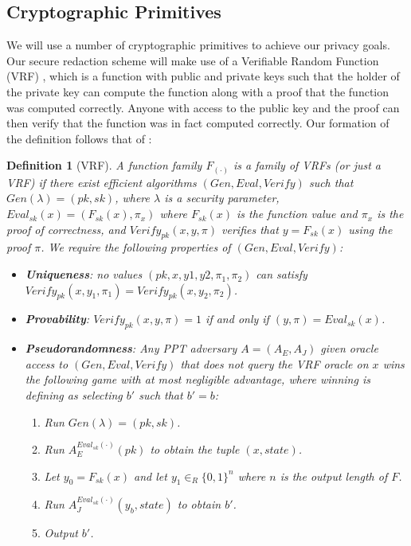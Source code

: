 \documentclass[letterpaper,twocolumn,10pt]{article}
\newtheorem{definition}[theorem]{Definition}
\begin{document}
\subsection{Cryptographic Primitives}
We will use a number of cryptographic primitives to achieve our privacy goals. Our secure redaction scheme will make use of a Verifiable Random Function (VRF) \cite{MRV99}, which is a function with public and private keys such that the holder of the private key can compute the function along with a proof that the function was computed correctly. Anyone with access to the public key and the proof can then verify that the function was in fact computed correctly. Our formation of the definition follows that of \cite{DY05}:
\begin{definition}[VRF]
A function family $F_{(\cdot)}$ is a family of VRFs (or just a VRF) if there exist efficient algorithms $(Gen, Eval, Verify)$ such that $Gen(\lambda)=(pk, sk)$, where $\lambda$ is a security parameter, $Eval_{sk}(x)=(F_{sk}(x), \pi_x)$ where $F_{sk}(x)$ is the function value and $\pi_x$ is the proof of correctness, and $Verify_{pk}(x,y,\pi)$ verifies that $y=F_{sk}(x)$ using the proof $\pi$. We require the following properties of $(Gen, Eval, Verify)$:
\begin{itemize}
\item \textbf{Uniqueness}: no values $(pk, x, y1, y2, \pi_1, \pi_2)$ can satisfy $Verify_{pk}(x, y_1, \pi_1) = Verify_{pk}(x, y_2, \pi_2)$.
\item \textbf{Provability}:  $Verify_{pk}(x,y,\pi)=1$ if and only if $(y,\pi)=Eval_{sk}(x)$.
\item \textbf{Pseudorandomness}: Any PPT adversary $A=(A_E,A_J)$ given oracle access to $(Gen, Eval, Verify)$ that does not query the VRF oracle on $x$ wins the following game with at most negligible advantage, where winning is defining as selecting $b'$ such that $b'=b$:
\begin{enumerate}
\item Run $Gen(\lambda)=(pk,sk)$.
\item Run $A_E^{Eval_{sk}(\cdot)}(pk)$ to obtain the tuple $(x, state)$.
\item Let $y_0=F_{sk}(x)$ and let $y_1\in_R\{0,1\}^n$ where $n$ is the output length of $F$.
\item Run $A_J^{Eval_{sk}(\cdot)}(y_b, state)$ to obtain $b'$.
\item Output $b'$.
\end{enumerate}
\end{itemize}
\end{definition}
\end{document}
